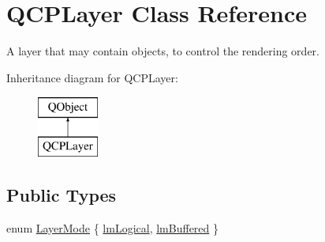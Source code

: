 \hypertarget{class_q_c_p_layer}{}\section{Q\+C\+P\+Layer Class Reference}
\label{class_q_c_p_layer}


A layer that may contain objects, to control the rendering order.  


Inheritance diagram for Q\+C\+P\+Layer\+:\begin{figure}[H]
\begin{center}
\leavevmode
\includegraphics[height=2.000000cm]{class_q_c_p_layer}
\end{center}
\end{figure}
\subsection*{Public Types}
\begin{DoxyCompactItemize}
\item 
enum \hyperlink{class_q_c_p_layer_a67dcfc1590be2a1f2227c5a39bb59c7c}{Layer\+Mode} \{ \hyperlink{class_q_c_p_layer_a67dcfc1590be2a1f2227c5a39bb59c7ca02eb5e9a4cb7f1baf1e2b6b99e3b87ce}{lm\+Logical}, 
\hyperlink{class_q_c_p_layer_a67dcfc1590be2a1f2227c5a39bb59c7cab581b9fab3007c4c65f057f4185d7538}{lm\+Buffered}
 \}
\end{DoxyCompactItemize}
